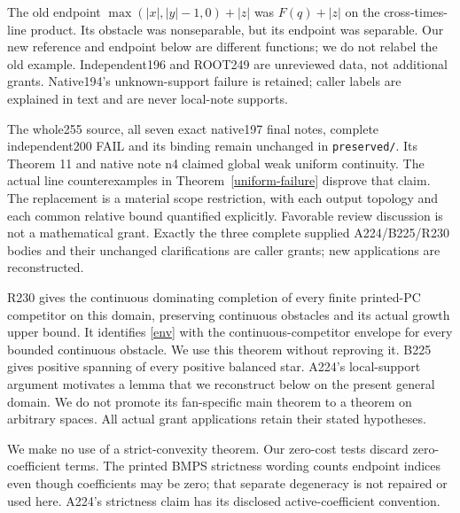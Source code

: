 \documentclass[11pt]{article}
\begin{document}
The old endpoint $\max(|x|,|y|-1,0)+|z|$ was $F(q)+|z|$ on the
cross-times-line product. Its obstacle was nonseparable, but its endpoint
was separable. Our new reference and endpoint below are different functions;
we do not relabel the old example. Independent196 and ROOT249 are unreviewed
data, not additional grants. Native194's unknown-support failure is retained;
caller labels are explained in text and are never local-note supports.


The whole255 source, all seven exact native197 final notes, complete
independent200 FAIL and its binding remain unchanged in \texttt{preserved/}.
Its Theorem 11 and native note n4 claimed global weak uniform continuity.
The actual line counterexamples in Theorem~\ref{uniform-failure} disprove
that claim. The replacement is a material scope restriction, with each
output topology and each common relative bound quantified explicitly.
Favorable review discussion is not a mathematical grant. Exactly the
three complete supplied A224/B225/R230 bodies and their unchanged
clarifications are caller grants; new applications are reconstructed.

R230 gives the continuous dominating completion of every finite printed-PC
competitor on this domain, preserving continuous obstacles and its actual
growth upper bound. It identifies \eqref{env} with the continuous-competitor
envelope for every bounded continuous obstacle. We use this theorem without
reproving it. B225 gives positive spanning of every positive balanced star.
A224's local-support argument motivates a lemma that we reconstruct below
on the present general domain. We do not promote its fan-specific main
theorem to a theorem on arbitrary spaces. All actual grant applications
retain their stated hypotheses.

We make no use of a strict-convexity theorem. Our zero-cost tests discard
zero-coefficient terms. The printed BMPS strictness wording counts endpoint
indices even though coefficients may be zero; that separate degeneracy is
not repaired or used here. A224's strictness claim has its disclosed
active-coefficient convention.
\end{document}

